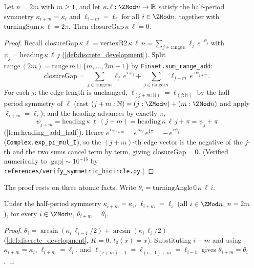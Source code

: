 \begin{lemma}
  \label{lem:central_symmetry_closes}
  Let $n = 2m$ with $m \ge 1$, and let $\kappa, \ell : \ZMod n \to \mathbb{R}$
  satisfy the half-period symmetry $\kappa_{i+m} = \kappa_i$ and
  $\ell_{i+m} = \ell_i$ for all $i \in \ZMod n$, together with
  $\mathrm{turningSum}\,\kappa\,\ell = 2\pi$. Then
  $\mathrm{closureGap}\,\kappa\,\ell = 0$.
\end{lemma}
\begin{proof}
  \leanok
  Recall $\mathrm{closureGap}\,\kappa\,\ell = \mathrm{vertexR2}\,\kappa\,\ell\,n
    = \sum_{j \in \mathrm{range}\,n} \ell_j\,e^{\,\mathrm{i}\,\psi_j}$ with
  $\psi_j = \mathrm{heading}\,\kappa\,\ell\,j$ (\cref{def:discrete_development}).
  Split $\mathrm{range}\,(2m) = \mathrm{range}\,m \sqcup \{m,\dots,2m-1\}$ by
  \texttt{Finset.sum\_range\_add}:
  \[
    \mathrm{closureGap}
      = \sum_{j \in \mathrm{range}\,m} \ell_j\,e^{\,\mathrm{i}\,\psi_j}
      + \sum_{j \in \mathrm{range}\,m} \ell_{j+m}\,e^{\,\mathrm{i}\,\psi_{j+m}} .
  \]
  For each $j$: the edge length is unchanged,
  $\ell_{(j+m : \mathbb{N})} = \ell_{(j : \mathbb{N})}$ by the half-period
  symmetry of $\ell$ (cast $(j+m : \mathbb{N}) = (j : \ZMod n) + (m : \ZMod n)$
  and apply $\ell_{i+m} = \ell_i$); and the heading advances by exactly $\pi$,
  \[
    \psi_{j+m} = \mathrm{heading}\,\kappa\,\ell\,(j+m)
      = \mathrm{heading}\,\kappa\,\ell\,j + \pi = \psi_j + \pi
  \]
  (\cref{lem:heading_add_half}). Hence
  $e^{\,\mathrm{i}\,\psi_{j+m}} = e^{\,\mathrm{i}\psi_j}\,e^{\,\mathrm{i}\pi}
    = -\,e^{\,\mathrm{i}\psi_j}$ (\texttt{Complex.exp\_pi\_mul\_I}), so the
  $(j+m)$-th edge vector is the negative of the $j$-th and the two sums cancel
  term by term, giving $\mathrm{closureGap} = 0$. (Verified numerically to
  $|\mathrm{gap}| \sim 10^{-16}$ by
  \texttt{references/verify\_symmetric\_bicircle.py}.)
\end{proof}

The proof rests on three atomic facts. Write $\theta_i = \mathrm{turningAngle}\,
0\,\kappa\,\ell\,i$.

\begin{lemma}
  \label{lem:turningangle_period}
  Under the half-period symmetry $\kappa_{i+m} = \kappa_i$, $\ell_{i+m} = \ell_i$
  (all $i \in \ZMod n$, $n = 2m$), for every $i \in \ZMod n$,
  $\theta_{i+m} = \theta_i$.
\end{lemma}
\begin{proof}

\leanok
  $\theta_i = \arcsin(\kappa_i\,\ell_{i-1}/2) + \arcsin(\kappa_i\,\ell_i/2)$
  (\cref{def:discrete_development}, $K=0$, $t_0(x)=x$). Substituting $i+m$ and
  using $\kappa_{i+m} = \kappa_i$, $\ell_{i+m} = \ell_i$, and
  $\ell_{(i+m)-1} = \ell_{(i-1)+m} = \ell_{i-1}$ gives $\theta_{i+m} = \theta_i$.
\end{proof}

